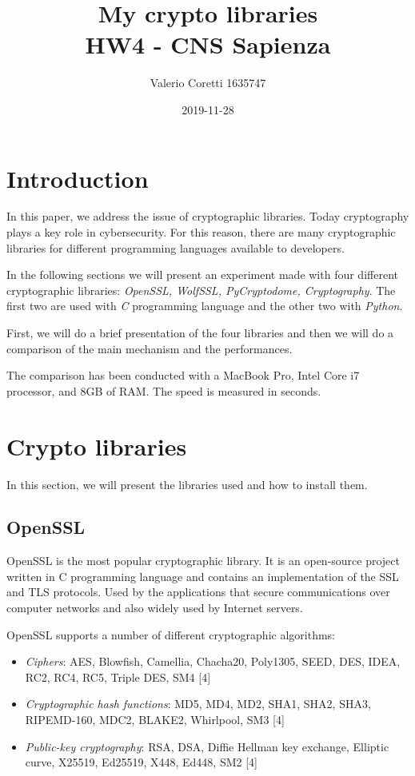 \documentclass[11pt]{article}
\title{{\bf My crypto libraries} \\ \bigskip \large HW4 - CNS Sapienza}
\date{2019-11-28}
\author{Valerio Coretti 1635747}
\begin{document}
\maketitle

\section{Introduction}
In this paper, we address the issue of cryptographic libraries. Today cryptography plays a key role in cybersecurity. For this reason, there are many cryptographic libraries for different programming languages available to developers.

In the following sections we will present an experiment made with four different cryptographic libraries: {\em OpenSSL, WolfSSL, PyCryptodome, Cryptography}. The first two are used with {\em C} programming language and the other two with {\em Python}.

First, we will do a brief presentation of the four libraries and then we will do a comparison of the main mechanism and the performances.

The comparison has been conducted with a MacBook Pro, Intel Core i7 processor, and 8GB of RAM. The speed is measured in seconds.

\section{Crypto libraries}
In this section, we will present the libraries used and how to install them.

\subsection{OpenSSL}
OpenSSL is the most popular cryptographic library. It is an open-source project written in C programming language and contains an implementation of the SSL and TLS protocols. Used by the applications that secure communications over computer networks and also widely used by Internet servers.

OpenSSL supports a number of different cryptographic algorithms:
\begin{itemize}
 \item {\em Ciphers}: AES, Blowfish, Camellia, Chacha20, Poly1305, SEED, DES, IDEA, RC2, RC4, RC5, Triple DES, SM4 [4]
 \item {\em Cryptographic hash functions}: MD5, MD4, MD2, SHA1, SHA2, SHA3, RIPEMD-160, MDC2, BLAKE2, Whirlpool, SM3 [4]
 \item {\em Public-key cryptography}: RSA, DSA, Diffie Hellman key exchange, Elliptic curve, X25519, Ed25519, X448, Ed448, SM2 [4]
\end{itemize}
\end{document}
